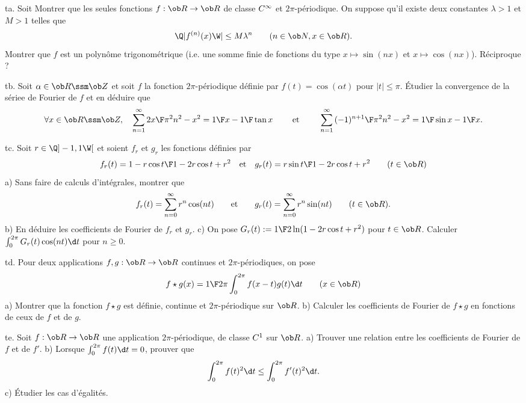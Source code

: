 \exo [Level=2,Fight=0,Learn=0,Type=\Exercices,Field=\SériesDeFourier,Origin=] ta. 
Soit Montrer que les seules fonctions $f:\ob R\to\ob R$ de classe $\sc C^\infty$ 
et $2\pi$-périodique. On suppose qu'il existe deux constantes $\lambda>1$ et $M>1$ telles que 
$$
\Q|f^{(n)}(x)\W|\le M\lambda^n\qquad(n\in\ob N, x\in\ob R). 
$$
Montrer que $f$ est un polynôme trigonométrique 
(i.e. une somme finie de fonctions du type $x\mapsto\sin(nx)$ et $x\mapsto\cos(nx)$). Réciproque ?

\exo [Level=2,Fight=0,Learn=0,Type=\Exercices,Field=\SériesDeFourier,Origin=] tb. 
Soit $\alpha\in\ob R\ssm\ob Z$ et soit $f$ la fonction $2\pi$-périodique 
définie par $f(t)=\cos(\alpha t)$ pour $|t|\le\pi$. 
Étudier la convergence de la sériee de Fourier de $f$ et en déduire que 
$$
\forall x\in\ob R\ssm\ob Z, \quad \sum_{n=1}^\infty{2x\F\pi^2n^2-x^2}={1\F x}-{1\F\tan x} \qquad\hbox{ et }
\qquad \sum_{n=1}^\infty{(-1)^{n+1}\F\pi^2n^2-x^2}={1\F\sin x}-{1\F x}. 
$$

\exo [Level=2,Fight=0,Learn=0,Type=\Exercices,Field=\SériesDeFourier,Origin=] tc. 
Soit $r\in\Q]-1,1\W[$ et soient $f_r$ et $g_r$ les fonctions définies par 
$$
f_r(t)={1-r\cos t\F 1-2r\cos t+r^2}\quad\hbox{et}\quad g_r(t)={r\sin t\F 1-2r\cos t+r^2}\qquad(t\in\ob R)
$$
a) Sans faire de calculs d'intégrales, montrer que 
$$
f_r(t)=\sum_{n=0}^\infty r^n\cos(nt)\qquad\hbox{et}\qquad g_r(t)=\sum_{n=0}^\infty r^n\sin(nt)\qquad(t\in\ob R). 
$$
b) En déduire les coefficients de Fourier de $f_r$ et $g_r$. \pn
c) On pose $G_r(t):={1\F2}\ln(1-2r\cos t+r^2)$ pour $t\in\ob R$. Calculer $\int_0^{2\pi}G_r(t)\cos(nt)\d t$ pour $n\ge 0$. 


\exo [Level=2,Fight=1,Learn=0,Type=\Exercices,Field=\SériesDeFourier,Origin=] td. 
Pour deux applications $f,g:\ob R\to\ob R$ continues et $2\pi$-périodiques, on pose 
$$
f\star g(x)={1\F2\pi}\int_0^{2\pi}f(x-t)g(t)\d t\qquad(x\in\ob R)
$$
a) Montrer que la fonction $f\star g$ est définie, 
continue et $2\pi$-périodique sur $\ob R$.  \pn
b) Calculer les coefficients de Fourier de $f\star g$ en fonctions de ceux de $f$ et de $g$. \pn


\exo [Level=2,Fight=1,Learn=2,Type=\Exercices,Field=\SériesDeFourier,Origin=] te. 
Soit $f:\ob R\to\ob R$ une application $2\pi$-périodique, 
de classe $\sc C^1$ sur $\ob R$. \pn
a) Trouver une relation entre les coefficients de Fourier de $f$ et de $f'$. \pn
b) Lorsque $\int_0^{2\pi}f(t)\d t=0$, prouver que 
$$
\int_0^{2\pi}f(t)^2\d t\le \int_0^{2\pi}f'(t)^2\d t. 
$$
c) Étudier les cas d'égalités. 

